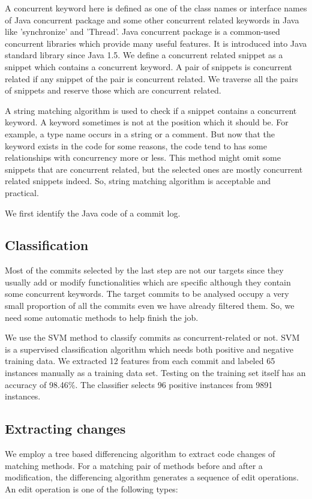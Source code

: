 \documentclass{sig-alternate-05-2015}
\begin{document}
A concurrent keyword here is defined as one of the class names or interface names of Java concurrent package and some other concurrent related keywords in Java like 'synchronize' and 'Thread'. Java concurrent package is a common-used concurrent libraries which provide many useful features. It is introduced into Java standard library since Java 1.5. We define a concurrent related snippet as a snippet which contains a concurrent keyword. A pair of snippets is concurrent related if any snippet of the pair is concurrent related. We traverse all the pairs of snippets and reserve those which are concurrent related.

A string matching algorithm is used to check if a snippet contains a concurrent keyword. A keyword sometimes is not at the position which it should be. For example, a type name occurs in a string or a comment. But now that the keyword exists in the code for some reasons, the code tend to has some relationships with concurrency more or less. This method might omit some snippets that are concurrent related, but the selected ones are mostly concurrent related snippets indeed. So, string matching algorithm is acceptable and practical.

We first identify the Java code of a commit log.

\subsection{Classification}
Most of the commits selected by the last step are not our targets since they usually add or modify functionalities which are specific although they contain some concurrent keywords. The target commits to be analysed occupy a very small proportion of all the commits even we have already filtered them. So, we need some automatic methods to help finish the job.

We use the SVM method to classify commits as concurrent-related or not. SVM is a supervised classification algorithm which needs both positive and negative training data. We extracted 12 features from each commit and labeled 65 instances manually as a training data set. Testing on the training set itself has an accuracy of 98.46\%. The classifier selects 96 positive instances from 9891 instances.

\subsection{Extracting changes}
We employ a tree based differencing algorithm to extract code changes of matching methods. For a matching pair of methods before and after a modification, the differencing algorithm generates a sequence of edit operations. An edit operation is one of the following types:
\end{document}
